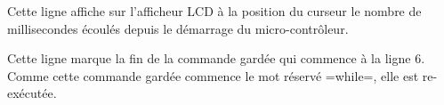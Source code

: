 \begin{OMNIBUS}[1]
Cette ligne affiche sur l'afficheur LCD à la position du curseur le nombre de millisecondes écoulés depuis le démarrage du micro-contrôleur.






\begin{OMNIBUS}[14]
  }
\end{OMNIBUS}

Cette ligne marque la fin de la commande gardée qui commence à la ligne $6$. Comme cette commande gardée commence le mot réservé \omnibus=while=, elle est re-exécutée.


%
%
%
%
%
%
%
%
%
%
%
%
%

\end{OMNIBUS}

